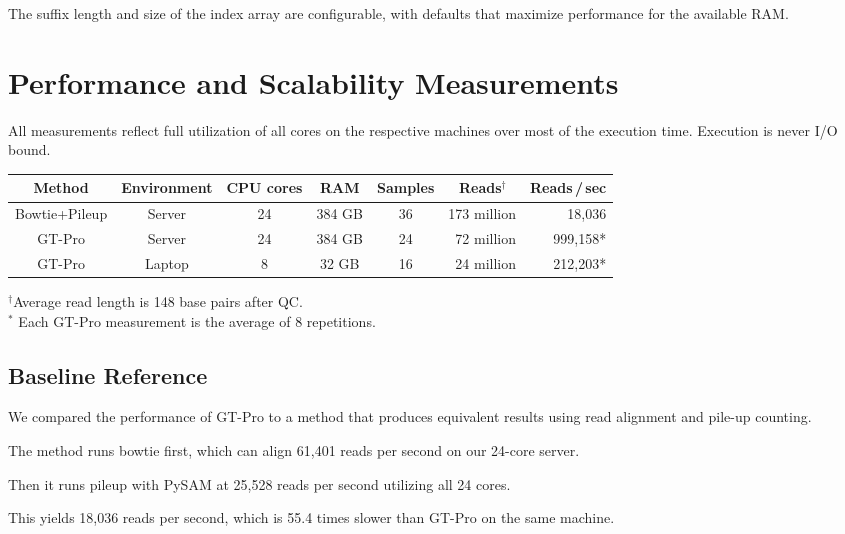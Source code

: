 \documentclass[10pt]{article}
\newcommand\figurebreak{}
\begin{document}
\figurebreak

The suffix length and size of the index array are configurable,
with defaults that maximize performance for the available RAM.


\section{Performance and Scalability Measurements}


All measurements reflect full utilization of all cores on the respective machines over most of the execution time.
Execution is never I/O bound.

\figurebreak

\renewcommand{\arraystretch}{2.0}
\begin{center}
\footnotesize
\begin{tabular}{|c|c|c|c|c|r|r|}
\hline
Method & Environment & CPU cores & RAM & Samples & \,\,\,\,Reads$^\dagger$\,\,\,\, & Reads\,/\,sec
\\ \hline
Bowtie+Pileup & Server & 24 & 384 GB & 36 & 173 million & 18,036\phantom{*}
\\ \hline
GT-Pro                & Server & 24 & 384 GB & 24 &  72 million & 999,158*
\\ \hline
GT-Pro                & Laptop & 8 & 32 GB & 16 &  24 million & 212,203*
\\ \hline
\end{tabular}

$^\dagger$Average read length is 148 base pairs after QC.\vphantom{\huge y}
\\
\vphantom{\Huge y}$^*$ Each GT-Pro measurement is the average of 8 repetitions.
\end{center}
\figurebreak



\subsection{Baseline Reference}


We compared the performance of GT-Pro to a method that produces equivalent results using read alignment and pile-up counting.

The method runs bowtie first, which can align 61,401 reads per second on our 24-core server.

Then it runs pileup with PySAM at 25,528 reads per second utilizing all 24 cores.

This yields 18,036 reads per second, which is 55.4 times slower than GT-Pro on the same machine.
\end{document}
